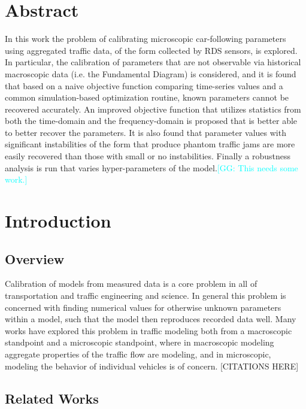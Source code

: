 \documentclass[english,titlepage,oneside,12pt]{article}
\newcommand{\kibitz}[2]{\ifnum\Comments=0\textcolor{#1}{#2}\fi}
\newcommand{\George}[1]{\kibitz{cyan}      {[GG: #1]}}
\begin{document}
\newpage

\thispagestyle{empty}
\section{Abstract}\label{sec:Abstract}

In this work the problem of calibrating microscopic car-following parameters using aggregated traffic data, of the form collected by RDS sensors, is explored. In particular, the calibration of parameters that are not observable via historical macroscopic data (i.e. the Fundamental Diagram) is considered, and it is found that based on a naive objective function comparing time-series values and a common simulation-based optimization routine, known parameters cannot be recovered accurately. An improved objective function that utilizes statistics from both the time-domain and the frequency-domain is proposed that is better able to better recover the parameters. It is also found that parameter values with significant instabilities of the form that produce phantom traffic jams are more easily recovered than those with small or no instabilities. Finally a robustness analysis is run that varies hyper-parameters of the model.\George{This needs some work.}

\section{Introduction}\label{sec:Introduction}

\subsection{Overview}\label{sec:Overview}

Calibration of models from measured data is a core problem in all of transportation and traffic engineering and science. In general this problem is concerned with finding numerical values for otherwise unknown parameters within a model, such that the model then reproduces recorded data well. Many works have explored this problem in traffic modeling both from a macroscopic standpoint and a microscopic standpoint, where in macroscopic modeling aggregate properties of the traffic flow are modeling, and in microscopic, modeling the behavior of individual vehicles is of concern. [CITATIONS HERE]

\subsection{Related Works}\label{sec:Related_Works}
\end{document}
